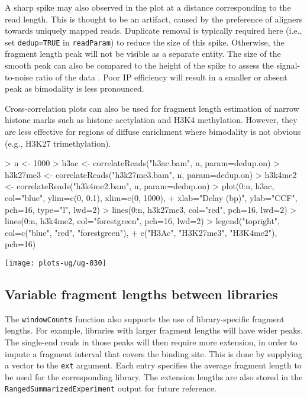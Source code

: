 \documentclass[12pt]{report}
\renewenvironment{Schunk}{\vspace{0pt}}{\vspace{0pt}}
\newcommand{\code}[1]{{\small\texttt{#1}}}
\begin{document}
A sharp spike may also observed in the plot at a distance corresponding to the read length. 
This is thought to be an artifact, caused by the preference of aligners towards uniquely mapped reads. 
Duplicate removal is typically required here (i.e., set \code{dedup=TRUE} in \code{readParam}) to reduce the size of this spike. 
Otherwise, the fragment length peak will not be visible as a separate entity.
The size of the smooth peak can also be compared to the height of the spike to assess the signal-to-noise ratio of the data \citep{landt2012}. 
Poor IP efficiency will result in a smaller or absent peak as bimodality is less pronounced. 

Cross-correlation plots can also be used for fragment length estimation of narrow histone marks such as histone acetylation and H3K4 methylation.
However, they are less effective for regions of diffuse enrichment where bimodality is not obvious (e.g., H3K27 trimethylation).

\begin{Schunk}
\begin{Sinput}
> n <- 1000
> h3ac <- correlateReads("h3ac.bam", n, param=dedup.on)
> h3k27me3 <- correlateReads("h3k27me3.bam", n, param=dedup.on)
> h3k4me2 <- correlateReads("h3k4me2.bam", n, param=dedup.on)
> plot(0:n, h3ac, col="blue", ylim=c(0, 0.1), xlim=c(0, 1000),
+     xlab="Delay (bp)", ylab="CCF", pch=16, type="l", lwd=2)
> lines(0:n, h3k27me3, col="red", pch=16, lwd=2)
> lines(0:n, h3k4me2, col="forestgreen", pch=16, lwd=2)
> legend("topright", col=c("blue", "red", "forestgreen"),
+     c("H3Ac", "H3K27me3", "H3K4me2"), pch=16)
\end{Sinput}
\end{Schunk}
\label{data:ccf}

\begin{center}
\texttt{[image: plots-ug/ug-030]}
\end{center}

\subsection{Variable fragment lengths between libraries}
\label{sec:coercelen}

The \code{windowCounts} function also supports the use of library-specific fragment lengths.
For example, libraries with larger fragment lengths will have wider peaks.
The single-end reads in those peaks will then require more extension, in order to impute a fragment interval that covers the binding site.
This is done by supplying a vector to the \code{ext} argument.
Each entry specifies the average fragment length to be used for the corresponding library.
The extension lengths are also stored in the \code{RangedSummarizedExperiment} output for future reference. 
\end{document}
